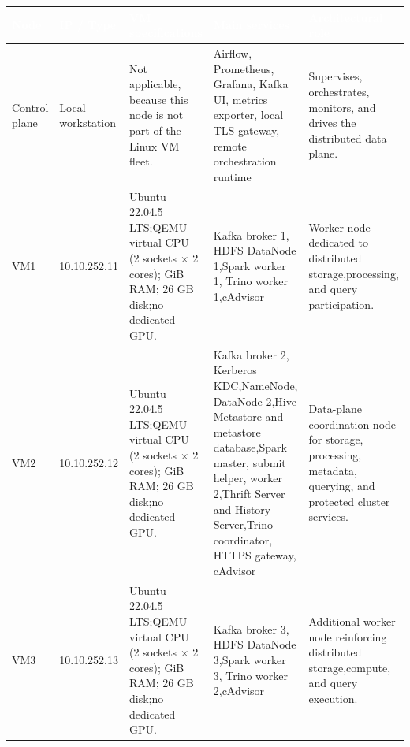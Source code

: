 \begin{table}[!htbp]
    \centering
    \footnotesize
    \renewcommand{\arraystretch}{1.16}
    \begin{tabularx}{\textwidth}{|L{1.45cm}|L{2.15cm}|L{3.0cm}|Y|Y|}
        \hline
        \textcolor{white}{\textbf{Node}} & \textcolor{white}{\textbf{IP / Type}} & \textcolor{white}{\textbf{VM specifications}} & \textcolor{white}{\textbf{Main services}} & \textcolor{white}{\textbf{Architectural role}} \\
        \hline
        Control plane & Local workstation & Not applicable, because this node is not part of the Linux VM fleet. & Airflow, Prometheus, Grafana, Kafka UI, metrics exporter, local TLS gateway, remote orchestration runtime & Supervises, orchestrates, monitors, and drives the distributed data plane. \\
        \hline
        VM1 & 10.10.252.11 & Ubuntu 22.04.5 LTS;\newline QEMU virtual CPU (2 sockets $\times$ 2 cores); GiB RAM; 26 GB disk;\newline no dedicated GPU. & Kafka broker 1, HDFS DataNode 1,\newline Spark worker 1, Trino worker 1,\newline cAdvisor & Worker node dedicated to distributed storage,\newline processing, and query participation. \\
        \hline
        VM2 & 10.10.252.12 & Ubuntu 22.04.5 LTS;\newline QEMU virtual CPU (2 sockets $\times$ 2 cores); GiB RAM; 26 GB disk;\newline no dedicated GPU. & Kafka broker 2, Kerberos KDC,\newline NameNode, DataNode 2,\newline Hive Metastore and metastore database,\newline Spark master, submit helper, worker 2,\newline Thrift Server and History Server,\newline Trino coordinator, HTTPS gateway, cAdvisor & Data-plane coordination node for storage, processing, metadata, querying, and protected cluster services. \\
        \hline
        VM3 & 10.10.252.13 & Ubuntu 22.04.5 LTS;\newline QEMU virtual CPU (2 sockets $\times$ 2 cores); GiB RAM; 26 GB disk;\newline no dedicated GPU. & Kafka broker 3, HDFS DataNode 3,\newline Spark worker 3, Trino worker 2,\newline cAdvisor & Additional worker node reinforcing distributed storage,\newline compute, and query execution. \\

\end{tabularx}
\end{table}
